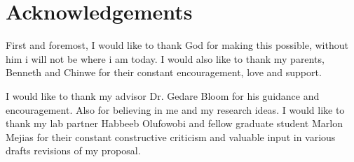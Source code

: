 

\chapter*{Acknowledgements}

First and foremost, I would like to thank God for making this possible, without him i will not be where i am today. I would also like to thank my parents, Benneth and Chinwe for their constant encouragement, love and support.  \par I would like to thank my advisor Dr. Gedare Bloom for his guidance and encouragement. Also for believing in me and my research ideas. I would like to thank my lab partner Habbeeb Olufowobi and fellow graduate student Marlon Mejias for their constant constructive criticism and valuable input in various drafts revisions of my proposal.